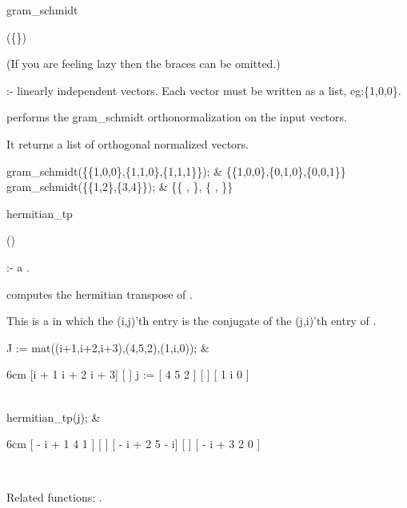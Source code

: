 \begin{Operator}{gram_schmidt}

\begin{Syntax}
(\{\}) 
\end{Syntax}

(If you are feeling lazy then the braces can be omitted.)

 :- linearly independent vectors. Each vector must be 
written as a list, eg:\{1,0,0\}. 

 performs the gram\_schmidt orthonormalization on
the input vectors. 

It returns a list of orthogonal normalized vectors.

\begin{Examples}

gram_schmidt(\{\{1,0,0\},\{1,1,0\},\{1,1,1\}\}); &
\{\{1,0,0\},\{0,1,0\},\{0,0,1\}\} \\

gram_schmidt(\{\{1,2\},\{3,4\}\}); &
\{\{  ,  \},
\{  ,  \}\}

\end{Examples}

\end{Operator}


\begin{Operator}{hermitian_tp}

\begin{Syntax}
()
\end{Syntax}

 :- a . 

 computes the hermitian transpose of . 

This is a  in which the (i,j)'th entry is the conjugate
of the (j,i)'th entry of . 

\begin{Examples}

J := mat((i+1,i+2,i+3),(4,5,2),(1,i,0)); &
\begin{multilineoutput}{6cm}
     [i + 1  i + 2  i + 3]
     [                   ]
j := [  4      5      2  ]
     [                   ]
     [  1      i      0  ]
\end{multilineoutput} \\

hermitian_tp(j); &
\begin{multilineoutput}{6cm}
[ - i + 1  4   1  ]
[                 ]
[ - i + 2  5   - i]
[                 ]
[ - i + 3  2   0  ]
\end{multilineoutput} \\

\end{Examples}

Related functions:
.

\end{Operator}


